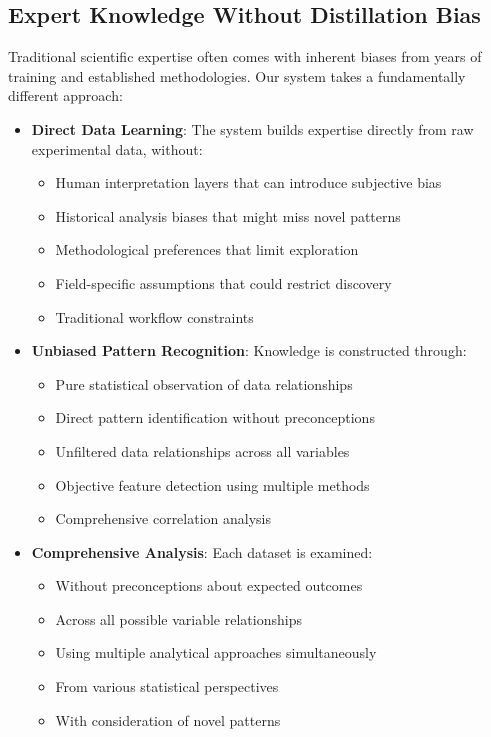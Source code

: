 \documentclass[11pt,a4paper]{article}
\begin{document}
\subsection{Expert Knowledge Without Distillation Bias}
Traditional scientific expertise often comes with inherent biases from years of training and established methodologies. Our system takes a fundamentally different approach:

\begin{itemize}
    \item \textbf{Direct Data Learning}: The system builds expertise directly from raw experimental data, without:
    \begin{itemize}
        \item Human interpretation layers that can introduce subjective bias
        \item Historical analysis biases that might miss novel patterns
        \item Methodological preferences that limit exploration
        \item Field-specific assumptions that could restrict discovery
        \item Traditional workflow constraints
    \end{itemize}
    
    \item \textbf{Unbiased Pattern Recognition}: Knowledge is constructed through:
    \begin{itemize}
        \item Pure statistical observation of data relationships
        \item Direct pattern identification without preconceptions
        \item Unfiltered data relationships across all variables
        \item Objective feature detection using multiple methods
        \item Comprehensive correlation analysis
    \end{itemize}
    
    \item \textbf{Comprehensive Analysis}: Each dataset is examined:
    \begin{itemize}
        \item Without preconceptions about expected outcomes
        \item Across all possible variable relationships
        \item Using multiple analytical approaches simultaneously
        \item From various statistical perspectives
        \item With consideration of novel patterns
    \end{itemize}
\end{itemize}
\end{document}
